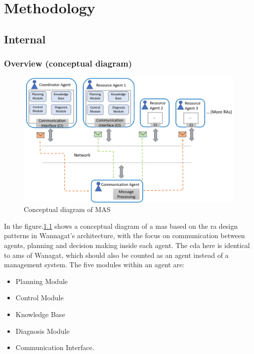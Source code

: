 \chapter{Methodology}%
\section{Internal}
\subsection{Overview (conceptual diagram)}



\begin{figure}[htb]
\includegraphics[width=\textwidth]{figures/MAS_Conceptual_Diagram.png}
\centering
\caption{Conceptual diagram of MAS\label{fig: MASConceptual}}
\end{figure}


In the figure.\ref{fig: MASConceptual} shows a conceptual diagram of a \gls{mas} based on the \gls{ra} design patterns in Wannagat’s architecture, with the focus on communication between agents, planning and decision making inside each agent. The \gls{cda} here is identical to \gls{ams} of Wanagat, which should also be counted as an agent instead of a management system. The five modules within an agent are: 
\begin{itemize}
\item Planning Module
\item Control Module
\item Knowledge Base
\item Diagnosis Module
\item Communication Interface.
\end{itemize}

